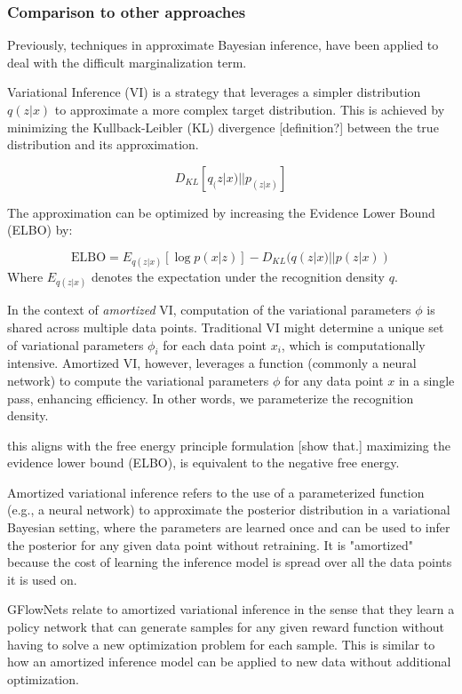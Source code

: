 \subsubsection{Comparison to other approaches}

Previously, techniques in approximate Bayesian inference, have been applied to deal with the difficult marginalization term.

Variational Inference (VI) is a strategy that leverages a simpler distribution \( q(z | x) \)  to approximate a more complex target distribution. This is achieved by minimizing the Kullback-Leibler (KL) divergence [definition?] between the true distribution and its approximation.

\[
    D_{KL}[q_(z|x) || p_(z|x)]
\]

The approximation can be optimized by increasing the Evidence Lower Bound (ELBO) by:

\begin{equation}
\text{ELBO} = E_{q(z|x)}[\log p(x|z)] - D_{KL}(q(z|x) || p(z|x))
\end{equation}
Where \( E_{q(z|x)} \) denotes the expectation under the recognition density \( q \).

In the context of \emph{amortized} VI, computation of the variational parameters \( \phi \) is shared across multiple data points. Traditional VI might determine a unique set of variational parameters \( \phi_i \) for each data point \( x_i \), which is computationally intensive. Amortized VI, however, leverages a function (commonly a neural network) to compute the variational parameters \( \phi \) for any data point \( x \) in a single pass, enhancing efficiency. In other words, we parameterize the recognition density. 

this aligns with the free energy principle formulation [show that.]
maximizing the evidence lower bound (ELBO), is equivalent to the negative free energy. 


Amortized variational inference refers to the use of a parameterized function (e.g., a neural network) to approximate the posterior distribution in a variational Bayesian setting, where the parameters are learned once and can be used to infer the posterior for any given data point without retraining. It is "amortized" because the cost of learning the inference model is spread over all the data points it is used on.

GFlowNets relate to amortized variational inference in the sense that they learn a policy network that can generate samples for any given reward function without having to solve a new optimization problem for each sample. This is similar to how an amortized inference model can be applied to new data without additional optimization.

